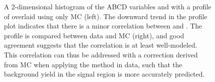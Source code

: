 \begin{figure}[htb]
    \centering
    \qquad
    \caption[A 2-dimensional histogram of the ABCD variables \MSD and \detajj with a profile of \MSD]{
        A 2-dimensional histogram of the ABCD variables \MSD and \detajj with a profile of \MSD overlaid using only MC (left). 
        The downward trend in the profile plot indicates that there is a minor correlation between \MSD and \detajj. 
        The profile is compared between data and MC (right), and good agreement suggests that the correlation is at least well-modeled. 
        This correlation can thus be addressed with a correction derived from MC when applying the method in data, such that the background yield in the signal region is more accurately predicted.
    }
\end{figure}

